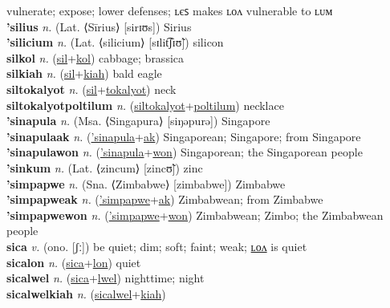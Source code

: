 vulnerate; expose; lower defenses; ʟєꜱ makes ʟᴏᴧ vulnerable to ʟᴜᴍ \label{silakipowiki} \\
\textbf{'silius} \textit{n.} (Lat. ⟨Sīrius⟩ [sirɪʊs])
Sirius \label{'silius} \\
\textbf{'silicium} \textit{n.} (Lat. ⟨silicium⟩ [sɪlit͡ʃɪʊ̃])
silicon \label{'silicium} \\
\textbf{silkol} \textit{n.} (\hyperref[sil]{sil}+\hyperref[kol]{kol})
cabbage; brassica \label{silkol} \\
\textbf{silkiah} \textit{n.} (\hyperref[sil]{sil}+\hyperref[kiah]{kiah})
bald eagle \label{silkiah} \\
\textbf{siltokalyot} \textit{n.} (\hyperref[sil]{sil}+\hyperref[tokalyot]{tokalyot})
neck \label{siltokalyot} \\
\textbf{siltokalyotpoltilum} \textit{n.} (\hyperref[siltokalyot]{siltokalyot}+\hyperref[poltilum]{poltilum})
necklace \label{siltokalyotpoltilum} \\
\textbf{'sinapula} \textit{n.} (Msa. ⟨Singapura⟩ [siŋəpurə])
Singapore \label{'sinapula} \\
\textbf{'sinapulaak} \textit{n.} (\hyperref['sinapula]{'sinapula}+\hyperref[ak]{ak})
Singaporean; Singapore; from Singapore \label{'sinapulaak} \\
\textbf{'sinapulawon} \textit{n.} (\hyperref['sinapula]{'sinapula}+\hyperref[won]{won})
Singaporean; the Singaporean people \label{'sinapulawon} \\
\textbf{'sinkum} \textit{n.} (Lat. ⟨zincum⟩ [zincʊ̃])
zinc \label{'sinkum} \\
\textbf{'simpapwe} \textit{n.} (Sna. ⟨Zimbabwe⟩ [zimbabwe])
Zimbabwe \label{'simpapwe} \\
\textbf{'simpapweak} \textit{n.} (\hyperref['simpapwe]{'simpapwe}+\hyperref[ak]{ak})
Zimbabwean; from Zimbabwe \label{'simpapweak} \\
\textbf{'simpapwewon} \textit{n.} (\hyperref['simpapwe]{'simpapwe}+\hyperref[won]{won})
Zimbabwean; Zimbo; the Zimbabwean people \label{'simpapwewon} \\
\textbf{sica} \textit{v.} (ono. [ʃː])
be quiet; dim; soft; faint; weak; \hyperref[sicalon]{ʟᴏᴧ} is quiet \label{sica} \\
\textbf{sicalon} \textit{n.} (\hyperref[sica]{sica}+\hyperref[lon]{lon})
quiet \label{sicalon} \\
\textbf{sicalwel} \textit{n.} (\hyperref[sica]{sica}+\hyperref[lwel]{lwel})
nighttime; night \label{sicalwel} \\
\textbf{sicalwelkiah} \textit{n.} (\hyperref[sicalwel]{sicalwel}+\hyperref[kiah]{kiah})
